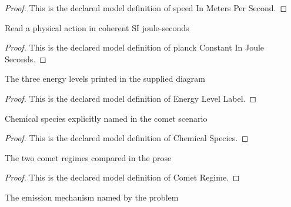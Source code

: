 \begin{proof}
  This is the declared model definition of speed In Meters Per Second.
\end{proof}
\begin{definition}
  \label{def:physics:phyx-mini-0577:phyxminiproblems-problemphyxmini0577-planckconstantinjouleseconds}
  Read a physical action in coherent SI joule-seconds
\end{definition}
\begin{proof}
  This is the declared model definition of planck Constant In Joule Seconds.
\end{proof}
\begin{definition}
  \label{def:physics:phyx-mini-0577:phyxminiproblems-problemphyxmini0577-energylevellabel}
  The three energy levels printed in the supplied diagram
\end{definition}
\begin{proof}
  This is the declared model definition of Energy Level Label.
\end{proof}
\begin{definition}
  \label{def:physics:phyx-mini-0577:phyxminiproblems-problemphyxmini0577-chemicalspecies}
  Chemical species explicitly named in the comet scenario
\end{definition}
\begin{proof}
  This is the declared model definition of Chemical Species.
\end{proof}
\begin{definition}
  \label{def:physics:phyx-mini-0577:phyxminiproblems-problemphyxmini0577-cometregime}
  The two comet regimes compared in the prose
\end{definition}
\begin{proof}
  This is the declared model definition of Comet Regime.
\end{proof}
\begin{definition}
  \label{def:physics:phyx-mini-0577:phyxminiproblems-problemphyxmini0577-emissionmode}
  The emission mechanism named by the problem
\end{definition}
